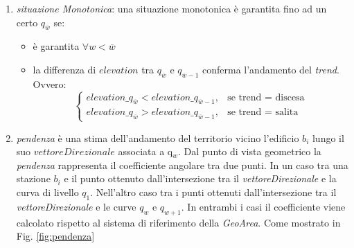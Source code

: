 \begin{enumerate}
\item \textit{situazione Monotonica}: una situazione monotonica è garantita fino ad un certo $q_{\overline{w}}$ se:
\begin{itemize}
\item è garantita $\forall w<\overline{w}$ 
\item la differenza di $elevation$ tra $q_{\overline{w}}$ e $q_{\overline{w}-1}$ conferma l'andamento del \textit{trend}. Ovvero:
\begin{equation}
\label{monotonica}
\begin{cases}
               elevation\_q_{\overline{w}} < elevation\_q_{\overline{w}-1},  & \text{se trend = discesa}\\
               elevation\_q_{\overline{w}} > elevation\_q_{\overline{w}-1}, & \text{se trend = salita}
            \end{cases} 
\end{equation}
\end{itemize} 


\item \textit{pendenza} è una stima dell'andamento del territorio vicino l'edificio $b_i$ lungo il suo $vettoreDirezionale$ associata a q$_w$. Dal punto di vista geometrico la \textit{pendenza} rappresenta il coefficiente angolare tra due punti. In un caso tra una stazione $b_i$ e il punto ottenuto dall'intersezione tra il \textit{vettoreDirezionale} e la curva di livello $q_1$. Nell'altro caso tra i punti ottenuti dall'intersezione tra il \textit{vettoreDirezionale} e le curve $q_w$ e $q_{w+1}$. In entrambi i casi il coefficiente viene calcolato rispetto al sistema di riferimento della \textit{GeoArea}.
Come mostrato in Fig. \ref{fig:pendenza}


\end{enumerate}
